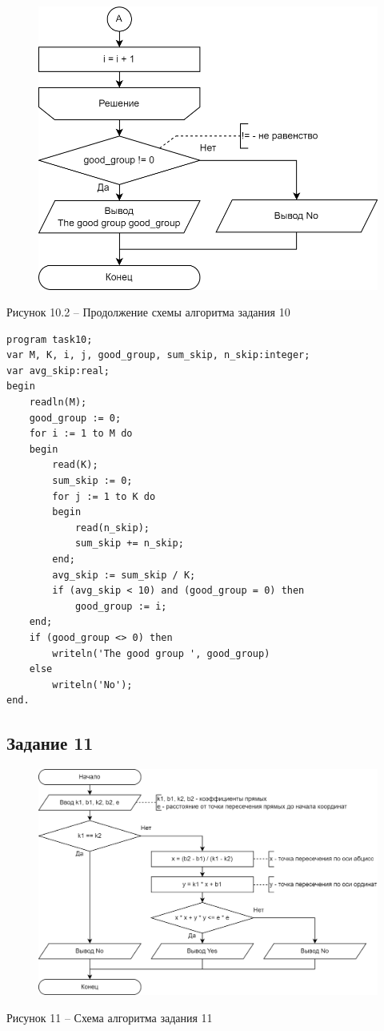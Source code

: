\documentclass[a4paper,14pt]{extarticle}
\begin{document}
  \pagebreak
  \begin{figure}[h]
    \centering
    \includegraphics[width=0.55\linewidth]{schemes/t-10-2}
  \end{figure}
  \begin{center}
    Рисунок 10.2 – Продолжение схемы алгоритма задания 10
  \end{center}

  \begin{lstlisting}
program task10;
var M, K, i, j, good_group, sum_skip, n_skip:integer;
var avg_skip:real;
begin
    readln(M);
    good_group := 0;
    for i := 1 to M do
    begin
        read(K);
        sum_skip := 0;
        for j := 1 to K do
        begin
            read(n_skip);
            sum_skip += n_skip;
        end;
        avg_skip := sum_skip / K;
        if (avg_skip < 10) and (good_group = 0) then
            good_group := i;
    end;
    if (good_group <> 0) then
        writeln('The good group ', good_group)
    else
        writeln('No');
end.
  \end{lstlisting}

  \subsection*{Задание 11}
  \begin{figure}[h]
    \centering
    \includegraphics[width=0.6\linewidth]{schemes/t-11}
  \end{figure}
  \begin{center}
    Рисунок 11 – Схема алгоритма задания 11
  \end{center}
\end{document}
